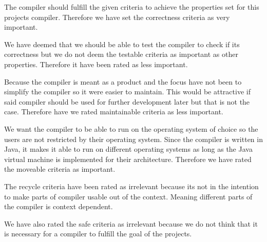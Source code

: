 The compiler should fulfill the given criteria to achieve the properties set for this projects compiler. Therefore we have set the correctness criteria as very important.

We have deemed that we should be able to test the compiler to check if its correctness but we do not deem the testable criteria as important as other properties. Therefore it have been rated as less important.

Because the compiler is meant as a product and the focus have not been to simplify the compiler so it were easier to maintain. This would be attractive if said compiler should be used for further development later but that is not the case. Therefore have we rated maintainable criteria as less important.

We want the compiler to be able to run on the operating system of choice so the users are not restricted by their operating system. Since the compiler is written in Java, it makes it able to run on different operating systems as long as the Java virtual machine is implemented for their architecture. Therefore we have rated the moveable criteria as important.

The recycle criteria have been rated as irrelevant because its not in the intention to make parts of compiler usable out of the context. Meaning different parts of the compiler is context dependent.

We have also rated the safe criteria as irrelevant because we do not think that it is necessary for a compiler to fulfill the goal of the projects.